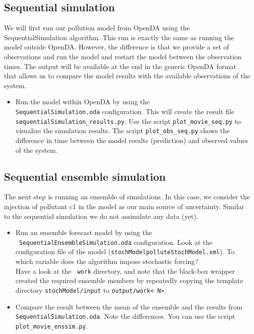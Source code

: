 
\subsection{Sequential simulation}
We will first run our pollution model from OpenDA using the SequentialSimulation algorithm. This run is exactly the same as running the model outside OpenDA. However, the difference is that we provide a set of observations and run the model and restart the model between the observation times. The output will be available at the end in the generic OpenDA format that allows us to compare the model results with the available observations of the system.

\begin{itemize}
\item Run the model within OpenDA by using
	 the \\{\tt SequentialSimulation.oda} configuration. This will create the result file 
		{\tt sequentialSimulation\_results.py}. Use the script  {\tt plot\_movie\_seq.py} to visualize
		the simulation results. The script {\tt plot\_obs\_seq.py} shows the difference in time between
		the model results (prediction) and observed values of the system.
\end{itemize}

\subsection{Sequential ensemble simulation}
The next step is running an ensemble of simulations. In this case, we consider the injection of pollutant c1 in the model as our main source of uncertainty. Similar to the sequential simulation we do not assimilate any data (yet).

\begin{itemize}
 \item Run an ensemble forecast model by using the \\{\tt
   SequentialEnsembleSimulation.oda} configuration. Look at the configuration file
   of the model ({\tt stochModel\/polluteStochModel.xml}). To which variable does the
   algorithm impose stochastic forcing?\\ Have a look at the {\tt
     work} directory, and note that the black-box wrapper created
   the required ensemble members by repeatedly copying the template directory
   {\tt stochModel/input} to {\tt output/work\textless
     N\textgreater}.
 \item Compare the result between the mean of the ensemble and the results from {\tt
     SequentialSimulation.oda}. Note the differences. 
     You can use the script {\tt plot\_movie\_enssim.py}.
\end{itemize}

